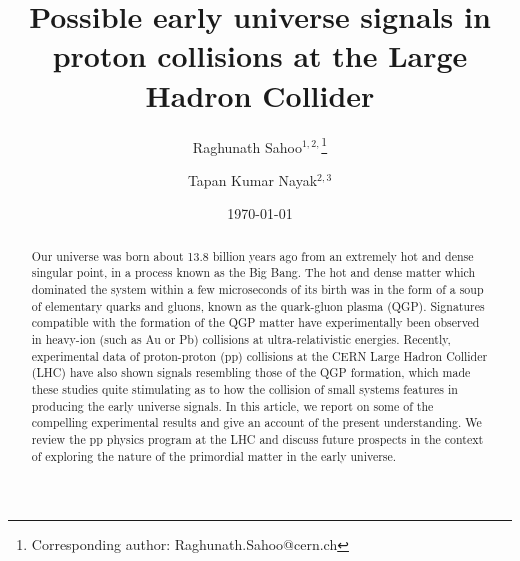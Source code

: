 \documentclass[showpacs,showkeys,aps,twocolumn]{revtex4}
\newcommand\+{\dagger}
\begin{document}
\title{Possible early universe signals in proton collisions at the Large Hadron Collider}
\author{Raghunath Sahoo$^{1,2,}$\footnote{Corresponding author: Raghunath.Sahoo@cern.ch }}
\author{Tapan Kumar Nayak$^{2,3}$}

\begin{abstract}
\noindent
Our universe was born about 13.8 billion years ago from an extremely hot and dense singular point, in a process known as the Big Bang. The hot and dense matter which dominated the system within a few microseconds of its birth was in the form of a soup of elementary quarks and gluons, known as the quark-gluon plasma (QGP). Signatures compatible with the formation of the QGP matter have experimentally been observed in heavy-ion (such as Au or Pb) collisions at ultra-relativistic energies. Recently, experimental data of proton-proton (pp) collisions at the CERN Large Hadron Collider (LHC) have also shown signals resembling those of the QGP formation, which made these studies quite stimulating as to how the collision of small systems features in producing the early universe signals. In this article, we report on some of the compelling experimental results and give an account of the present understanding. We review the pp physics program at the LHC and discuss future prospects in the context of exploring the nature of the primordial matter in the early universe.\pacs{}
\end{abstract}

\date{\today}
\maketitle 
\end{document}
